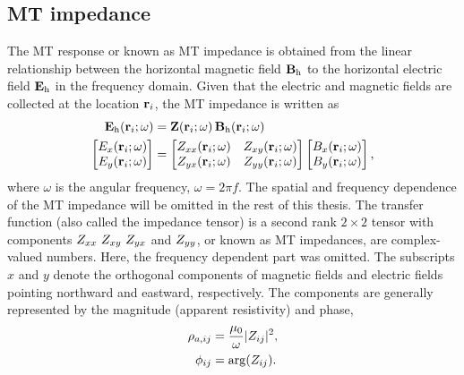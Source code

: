 \subsection*{\hspace{20mm}MT impedance}
		 The MT response or known as MT impedance is obtained from the linear relationship between the horizontal magnetic field $\mathbf{B}_\text{h}$ to the horizontal electric field $\mathbf{E}_\text{h}$ in the frequency domain. 
		 Given that the electric and magnetic fields are collected at the location $\mathbf{r}_i$, the MT impedance is written as
	\begin{equation} 
		\begin{split}
			\mathbf{E}_\text{h}(\mathbf{r}_i;\omega) & = \mathbf{Z}(\mathbf{r}_i;\omega)\, \mathbf{B}_\text{h}(\mathbf{r}_i;\omega) \\
			\begin{bmatrix} E_x(\mathbf{r}_i;\omega) \\ E_y(\mathbf{r}_i;\omega) \end{bmatrix} & = \begin{bmatrix} Z_{xx}(\mathbf{r}_i;\omega) & Z_{xy}(\mathbf{r}_i;\omega) \\ Z_{yx}(\mathbf{r}_i;\omega) & Z_{yy}(\mathbf{r}_i;\omega) \end{bmatrix}\begin{bmatrix} B_x(\mathbf{r}_i;\omega) \\ B_y(\mathbf{r}_i;\omega) \end{bmatrix},
		\end{split}
	\end{equation}
	where $\omega$ is the angular frequency, $\omega=2\pi f$.
	The spatial and frequency dependence of the MT impedance will be omitted in the rest of this thesis.
	The transfer function {\Zbf} (also called the impedance tensor) is a second rank $2\times2$ tensor with components $\Zxx\ \Zxy\ \Zyx$ and ${Z_{yy}}$, or known as MT impedances, are complex-valued numbers. Here, the frequency dependent part was omitted. The subscripts $x$ and $y$ denote the orthogonal components of magnetic fields and electric fields pointing northward and eastward, respectively. 
	The components are generally represented by the magnitude (apparent resistivity) and phase,
	\begin{equation}
		\begin{split}
			\rho_{a,ij} & =\frac{\mu_0}{\omega} | Z_{ij} | ^2, \\
			\phi_{ij} & = \arg(Z_{ij}).
		\end{split}
	\end{equation}

